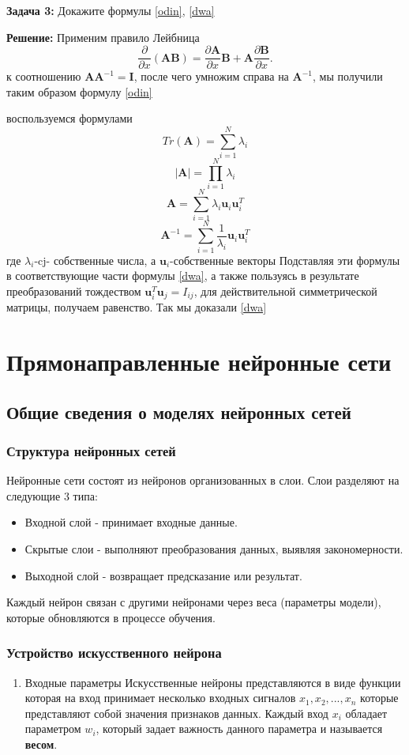 {\textbf{Задача 3:}
Докажите формулы \ref{odin}, \ref{dwa} \

\textbf{Решение:}
Применим правило Лейбница
\[
\frac{\partial}{\partial x} (\mathbf{AB})=\frac{\partial \mathbf{A}}{\partial x}
 \mathbf{B}+\mathbf{A}\frac{\partial \mathbf{B}}{\partial x}.
\]
к соотношению $\mathbf{AA}^{-1}=\mathbf{I}$, после чего умножим справа на $\mathbf{A}^{-1}$, мы получили таким образом формулу \ref{odin}

воспользуемся формулами 
\[
Tr(\mathbf{A})=\displaystyle \sum_{i=1}^{N} \lambda_i
\]
\[
|\mathbf{A}|=\displaystyle \prod_{i=1}^{N} \lambda_i
\]
\[
\mathbf{A}=\displaystyle \sum_{i=1}^{N} \lambda_i \mathbf{u}_i\mathbf{u}_i^{T}
\]
\[
\mathbf{A}^{-1}=\displaystyle \sum_{i=1}^{N} \frac{1}{\lambda_i} \mathbf{u}_i\mathbf{u}_i^{T}
\]
где $\lambda_i$-cj- собственные числа, а $\mathbf{u}_i$-собственные векторы
Подставляя эти формулы в соответствующие части формулы \ref{dwa}, а также пользуясь в результате преобразований тождеством $\mathbf{u}_i^{T}\mathbf{u}_j=I_{ij}$, для действительной симметрической матрицы, получаем равенство. Так мы доказали \ref{dwa}


\section{Прямонаправленные нейронные сети}
\subsection{Общие сведения о моделях нейронных сетей}

\subsubsection{Структура нейронных сетей}

Нейронные сети состоят из нейронов организованных в слои. Слои разделяют на следующие 3 типа:
\begin{itemize}
\item Входной слой - принимает входные данные.
\item Скрытые слои - выполняют преобразования данных, выявляя закономерности.
\item Выходной слой - возвращает предсказание или результат.
\end{itemize}

Каждый нейрон связан с другими нейронами через веса (параметры модели), которые обновляются в
процессе обучения.
\subsubsection{Устройство искусственного нейрона}
\begin{enumerate}
\item Входные параметры
Искусственные нейроны представляются в виде функции которая на вход принимает несколько входных
сигналов \(x_{1}, x_{2}, ..., x_{n}\) которые представляют собой значения признаков данных. Каждый
вход \(x_{i}\) обладает параметром \(w_{i}\), который задает важность данного параметра и называется
\textbf{весом}.


\end{enumerate}}
